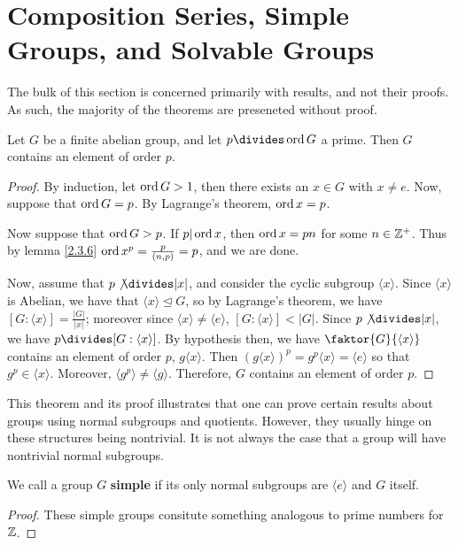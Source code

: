 \section{Composition Series, Simple Groups, and Solvable Groups}
\label{section_3.5}

The bulk of this section is concerned primarily with results, and not their
proofs. As such, the majority of the theorems are preseneted without proof.

\begin{theorem}\label{theorem_3.5.1}
  Let $G$ be a finite abelian group, and let  $p \divides \ord{G}$ a prime. Then
  $G$ contains an element of order  $p$.
\end{theorem}
\begin{proof}
  By induction, let $\operatorname{ord}{G}>1$, then there exists an $x \in G$ with  $x \neq
  e$. Now, suppose that $\operatorname{ord}{G}=p$. By  Lagrange's theorem, $\operatorname{ord}{x}=p$.

  Now suppose that $\operatorname{ord}{G} > p$. If $p|\operatorname{ord}{x}$, then $\operatorname{ord}{x}=pn$ for some
  $n \in \mathbb{Z}^+$. Thus by lemma \ref{2.3.6} $\operatorname{ord}{x^p}=\frac{p}{(n,p)}=p$, and
  we are done.

  Now, assume that $p \not{\divides} |x|$, and consider the cyclic
  subgroup $\langle x \rangle$. Since $\langle x \rangle$ is Abelian,
  we have that $\langle x \rangle \unlhd G$, so by Lagrange's theorem,
  we have $[G: \langle x \rangle]=\frac{|G|}{|x|}$; moreover since
  $\langle x \rangle \neq \langle e \rangle$, $[G: \langle x \rangle]
  < |G|$. Since $p \not{\divides} |x|$, we have $p \divides [G :
  \langle x \rangle]$. By hypothesis then, we have $\faktor{G}{\langle
  x \rangle}$ contains an element of order $p$,  $g\langle x \rangle$.
  Then $(g\langle x \rangle)^p=g^p\langle x \rangle=\langle e \rangle$
  so that $g^p \in \langle x \rangle$. Moreover, $\langle g^p \rangle
  \neq \langle g \rangle$. Therefore, $G$ contains an element of order
  $p$.
\end{proof}
\begin{remark}
  This theorem and its proof illustrates that one can prove certain results
  about groups using normal subgroups and quotients. However, they usually
  hinge on these structures being nontrivial. It is not always the case that a
  group will have nontrivial normal subgroups.
\end{remark}

\begin{definition}
  We call a group $G$ \textbf{simple} if its only normal subgroups are
  $\langle e \rangle$ and $G$ itself.
\end{definition}
\begin{proof}
  These simple groups consitute something analogous to prime numbers
  for $\mathbb{Z}$.
\end{proof}

